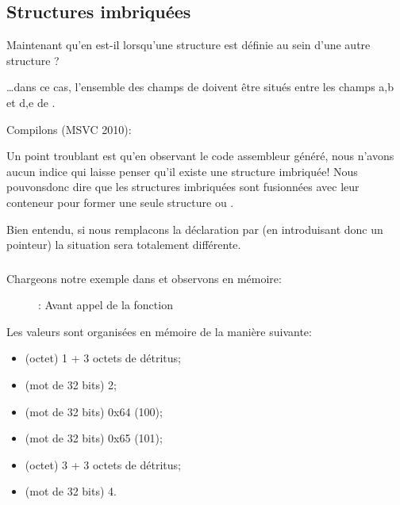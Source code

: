 \subsection{Structures imbriquées}

Maintenant qu'en est-il lorsqu'une structure est définie au sein d'une autre structure ?



\dots dans ce cas, l'ensemble des champs de  doivent être situés entre les champs a,b et 
d,e de .

Compilons (MSVC 2010):



Un point troublant est qu'en observant le code assembleur généré, nous n'avons aucun indice qui laisse penser 
qu'il existe une structure imbriquée!
Nous pouvonsdonc dire que les structures imbriquées sont fusionnées avec leur conteneur pour former une seule 
structure  ou .

Bien entendu, si nous remplacons la déclaration  par  
(en introduisant donc un pointeur) la situation sera totalement différente.

\clearpage
\subsubsection{\olly}
\myindex{\olly}

Chargeons notre exemple dans \olly et observons  en mémoire:

\begin{figure}[H]
\centering
{}
\caption{\olly: Avant appel de la fonction \printf}
\label{fig:nested_olly}
\end{figure}

Les valeurs sont organisées en mémoire de la manière suivante:
\begin{itemize}
\item {} (octet) 1 + 3 octets de détritus;
\item {} (mot de 32 bits) 2;
\item {} (mot de 32 bits) 0x64 (100);
\item {} (mot de 32 bits) 0x65 (101);
\item {} (octet) 3 + 3 octets de détritus;
\item {} (mot de 32 bits) 4.
\end{itemize}

